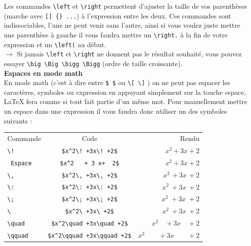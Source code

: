 \documentclass[11pt]{article}				%
\begin{document}
Les commandes \verb|\left| et \verb|\right| permettent d'ajuster la taille de vos parenthèses (marche avec \verb|[] {} ...|) à l'expression entre les deux. Ces commandes sont indissociables, l'une ne peut venir sans l'autre, ainsi si vous voulez juste mettre une parenthèse à gauche il vous faudra mettre un \verb|\right.| à la fin de votre expression et un \verb|\left(| au début.\\

$\rightarrow$ Si jamais \verb|\left| et \verb|\right| ne donnent pas le résultat souhaité, vous pouvez essayer \verb|\big \Big \bigg \Bigg| (ordre de taille croissante).\\


\textbf{Espaces en mode math}\\

En mode math (c'est à dire entre \verb|$ $| ou \verb|\[ \]| ) on ne peut pas espacer les caractères, symboles ou expression en appuyant simplement sur la touche espace, LaTeX fera comme si tout fait partie d'un même mot. Pour manuellement mettre un espace dans une expression il vous faudra donc utiliser un des symboles suivants :\\

\begin{center}
	\begin{tabular}{lcr}
	
	Commande & Code   &  Rendu \\ 
	
	\verb|\!|  & \verb|$x^2\! +3x\! +2$| & $ x^2\! +3x\! +2$   \\ 
	 
	\verb| Espace |&\verb|$x^2   + 3 x+  2$|  & $x^2+3x+2$ \\ 
	 
	 \verb|\,| & \verb|$x^2\, +3x\, +2$| & $x^2\, +3x\, +2$ \\ 
	 
	 \verb|\:|& \verb|$x^2\: +3x\: +2$| & $x^2\: +3x\: +2$ \\ 
	 
	 \verb|\;|& \verb|$x^2\; +3x\; +2$| & $x^2\; +3x\; +2$ \\ 
	 
	 \verb|\ | & \verb|$x^2\ +3x\ +2$| &  $x^2\ +3x\ +2$ \\ 
	 
	\verb|\quad | & \verb|$x^2\quad +3x\quad +2$| & $x^2\quad +3x\quad +2$  \\ 
	 
	 \verb|\qquad | & \verb|$x^2\qquad +3x\qquad +2$| & $x^2\qquad +3x\qquad +2$  \\ 
\end{tabular}
\end{center} 
\end{document}

